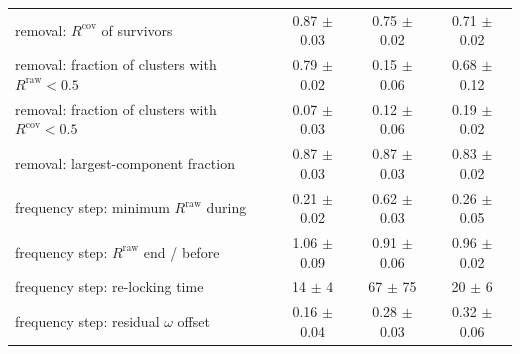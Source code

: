 \begin{tabular}{@{}lccc@{}}
removal: $R^{\mathrm{cov}}$ of survivors & 0.87 $\pm$ 0.03 & 0.75 $\pm$ 0.02 & 0.71 $\pm$ 0.02 \\
removal: fraction of clusters with $R^{\mathrm{raw}}<0.5$ & 0.79 $\pm$ 0.02 & 0.15 $\pm$ 0.06 & 0.68 $\pm$ 0.12 \\
removal: fraction of clusters with $R^{\mathrm{cov}}<0.5$ & 0.07 $\pm$ 0.03 & 0.12 $\pm$ 0.06 & 0.19 $\pm$ 0.02 \\
removal: largest-component fraction & 0.87 $\pm$ 0.03 & 0.87 $\pm$ 0.03 & 0.83 $\pm$ 0.02 \\
frequency step: minimum $R^{\mathrm{raw}}$ during & 0.21 $\pm$ 0.02 & 0.62 $\pm$ 0.03 & 0.26 $\pm$ 0.05 \\
frequency step: $R^{\mathrm{raw}}$ end / before & 1.06 $\pm$ 0.09 & 0.91 $\pm$ 0.06 & 0.96 $\pm$ 0.02 \\
frequency step: re-locking time & 14 $\pm$ 4 & 67 $\pm$ 75 & 20 $\pm$ 6 \\
frequency step: residual $\omega$ offset & 0.16 $\pm$ 0.04 & 0.28 $\pm$ 0.03 & 0.32 $\pm$ 0.06 \\
\bottomrule
\end{tabular}
